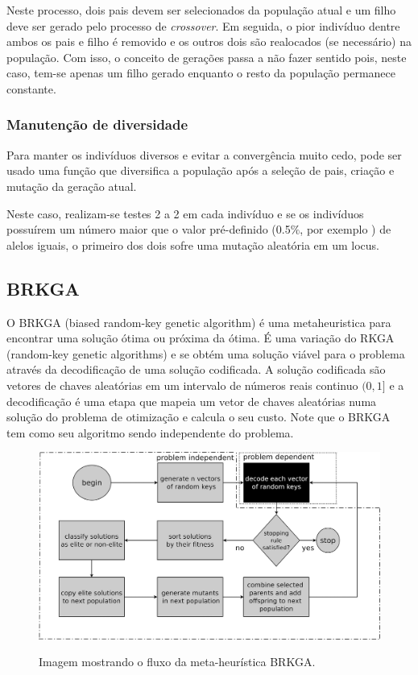 \documentclass[conference]{IEEEtran}
\begin{document}
        Neste processo, dois pais devem ser selecionados da população atual e um filho deve ser gerado pelo processo de \emph{crossover}. Em seguida, o pior indivíduo dentre ambos os pais e filho é
        removido e os outros dois são realocados (se necessário) na população. Com isso, o conceito de gerações passa a não fazer sentido pois, neste caso, tem-se apenas um filho gerado enquanto o
        resto da população permanece constante.  

    \subsubsection{Manutenção de diversidade}

        Para manter os indivíduos diversos e evitar a convergência muito cedo, pode ser usado uma função que diversifica a população após a seleção de pais, criação e mutação da geração atual.

        Neste caso, realizam-se testes 2 a 2 em cada indivíduo e se os indivíduos possuírem um número maior que o valor pré-definido (0.5$\%$, por exemplo ) de alelos iguais, o primeiro dos
        dois sofre uma mutação aleatória em um locus.


\subsection{BRKGA}
\label{sec:alg_genetic}

    O BRKGA (biased random-key genetic algorithm)\cite{gonccalves2011biased} é uma metaheuristica para encontrar uma solução ótima ou próxima da ótima. É uma variação do RKGA
    (random-key genetic algorithms) \cite{bean1994genetic} e se obtém uma solução viável para o problema através da decodificação de uma solução codificada. A solução codificada são vetores de
    chaves aleatórias em um intervalo de números reais continuo $(0,1]$ e a decodificação é uma etapa que mapeia um vetor de chaves aleatórias numa solução do problema de otimização e calcula o
    seu custo. Note que o BRKGA tem como seu algoritmo sendo independente do problema. 
    
       \begin{figure}[!htb]
  \centering
 
  \includegraphics[scale=0.08]{imagens/brkga.jpg}
  \label{figura_brkga}
 \caption{Imagem mostrando o fluxo da meta-heurística BRKGA. \cite{gonccalves2014experimental}}
\end{figure}
\end{document}
